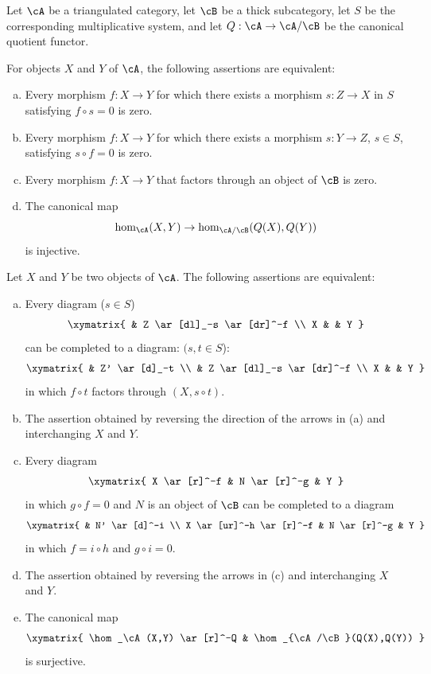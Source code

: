 \documentclass[oneside]{book}
\begin{document}
Let $\cA$ be a triangulated category, let $\cB$ be a thick subcategory,
let $S$ be the corresponding multiplicative system, and let
$Q:\cA\to \cA/\cB$ be the canonical quotient functor.

\begin{proposition}\label{VIII:2-5-1}
For objects $X$ and $Y$ of $\cA$, the following assertions are equivalent:
\begin{enumerate}[(a)]
  \item Every morphism $f:X\to Y$ for which there exists a morphism
    $s:Z\to X$ in $S$ satisfying $f\circ s=0$ is zero.
  \item Every morphism $f:X\to Y$ for which there exists a morphism
    $s:Y\to Z$, $s\in S$, satisfying $s\circ f=0$ is zero.
  \item Every morphism $f:X\to Y$ that factors through an object of $\cB$
    is zero.
  \item The canonical map
    \[
      \hom_\cA(X,Y) \to \hom_{\cA/\cB}(Q(X),Q(Y))
    \]
    is injective.
\end{enumerate}
\end{proposition}

\begin{proposition}\label{VIII:2-5-2}
Let $X$ and $Y$ be two objects of $\cA$. The following assertions are
equivalent:
\begin{enumerate}[(a)]
  \item Every diagram ($s\in S$)
    \[\xymatrix{
      & Z \ar[dl]_-s \ar[dr]^-f \\
      X
        & & Y
    }\]
    can be completed to a diagram: $(s,t\in S$):
    \[\xymatrix{
      & Z' \ar[d]_-t \\
      & Z \ar[dl]_-s \ar[dr]^-f \\
      X
        & & Y
    }\]
    in which $f\circ t$ factors through $(X,s\circ t)$.
  \item The assertion obtained by reversing the direction of the arrows in
    (a) and interchanging $X$ and $Y$.
  \item Every diagram
    \[\xymatrix{
      X \ar[r]^-f
        & N \ar[r]^-g
        & Y
    }\]
    in which $g\circ f=0$ and $N$ is an object of $\cB$ can be completed
    to a diagram
    \[\xymatrix{
      & N' \ar[d]^-i \\
      X \ar[ur]^-h \ar[r]^-f
        & N \ar[r]^-g
        & Y
    }\]
    in which $f=i\circ h$ and $g\circ i=0$.
  \item The assertion obtained by reversing the arrows in (c) and
    interchanging $X$ and $Y$.
  \item The canonical map
    \[\xymatrix{
      \hom_\cA(X,Y) \ar[r]^-Q
        & \hom_{\cA/\cB}(Q(X),Q(Y))
    }\]
    is surjective.
\end{enumerate}
\end{proposition}
\end{document}

